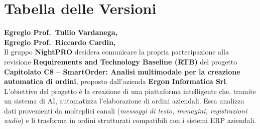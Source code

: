 \documentclass[a4paper, 11pt, oneside]{scrartcl} %
\begin{document}
\section*{Tabella delle Versioni}
\vspace{0.2cm} 
\begin{center}
\end{center}




\newpage

\noindent
\textbf{Egregio Prof.~Tullio Vardanega,}\\
\textbf{Egregio Prof.~Riccardo Cardin,}\\[0.6em]

\noindent
Il gruppo \textbf{NightPRO} desidera comunicare la propria partecipazione alla revisione \textbf{Requirements and Technology Baseline (RTB)} del progetto \textbf{Capitolato C8 – SmartOrder: Analisi multimodale per la creazione automatica di ordini}, proposto dall'azienda \textbf{Ergon Informatica Srl}.\\[0.6em]
\noindent
L'obiettivo del progetto è la creazione di una piattaforma intelligente che, tramite un sistema di AI, automatizza l'elaborazione di ordini aziendali. Essa analizza dati provenienti da molteplici canali (\textit{messaggi di testo, immagini, registrazioni audio}) e li trasforma in ordini strutturati compatibili con i sistemi ERP aziendali.\\[0.6em]
\end{document}
